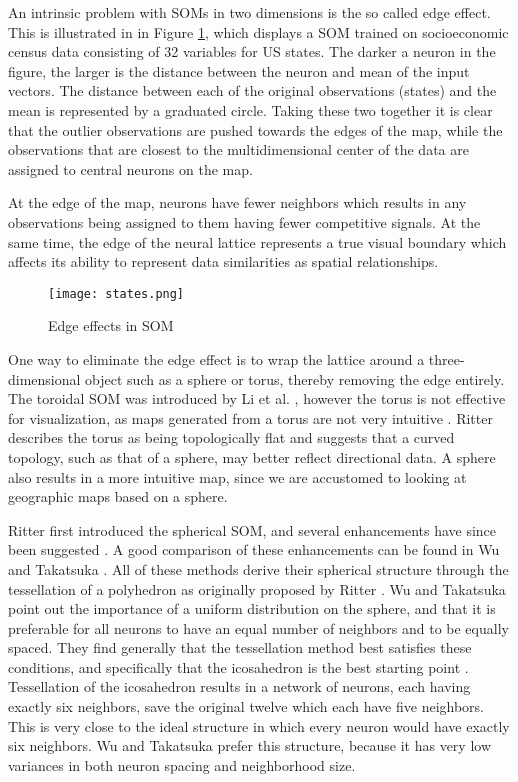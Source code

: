 
An intrinsic problem with SOMs in two dimensions is the so called edge
effect. This is illustrated in  in Figure \ref{f:edge}, which displays a SOM
trained on socioeconomic census data consisting of 32 variables for US states.
The darker a neuron in the figure, the larger is the distance between the
 neuron and mean of the input vectors. The distance between each of the
 original observations (states) and the mean is represented by a graduated
 circle. Taking these two together it is clear that the outlier observations
 are pushed towards the edges of the map, while the observations that are
 closest to the multidimensional center of the data are assigned to central
 neurons on the map.

At the edge of the map, neurons have fewer neighbors which results in any
observations being assigned to them having fewer competitive signals. At the
same time, the edge of the neural lattice represents a true visual boundary
which affects its ability to represent data similarities as spatial
relationships.

\begin{figure}
  \begin{center}
\caption{Edge effects in SOM}\label{f:edge}
  \texttt{[image: states.png]}
\end{center}
\end{figure}

One way to eliminate the edge effect is to wrap the lattice around a
three-dimensional object such as a sphere or torus, thereby removing the edge
entirely. The toroidal SOM was introduced by Li et al. \cite{li1993}, however the torus
is not effective for visualization, as maps generated from a torus are not
very intuitive \cite{ito2000,wu2006}.  Ritter \cite{ritter99} describes the torus as
being topologically flat and suggests that a curved topology, such as that of
a sphere, may better reflect directional data.  A sphere also results in a
more intuitive map, since we are accustomed to looking at geographic maps
based on a sphere.  

\label{bg:sphere}
Ritter \cite{ritter99} first introduced the spherical SOM, and several enhancements have
since been suggested \cite{boudjemai2003,sangole03,Nishio:2006fk,wu2006}.  A
good comparison of these enhancements can be found in Wu and Takatsuka
 \cite{wu2006}.  All of
these methods derive their spherical structure through the tessellation of a
polyhedron as originally proposed by Ritter \cite{ritter99}.  Wu and Takatsuka \cite{wu2006} point
out the importance of a uniform distribution on the sphere, and that it is
preferable for all neurons to have an equal number of neighbors and to be
equally spaced.  They find generally that the tessellation method best satisfies
these conditions, and specifically that the icosahedron is the best starting
point \cite{wu2005}. Tessellation of the icosahedron results in a network of
neurons, each having exactly six neighbors, save the original twelve
which each have five neighbors.  This is very close to the ideal structure in
which every neuron would have exactly six neighbors.  Wu and Takatsuka \cite{wu2006} prefer
this structure, because it has very low variances in both neuron spacing
and neighborhood size. 

